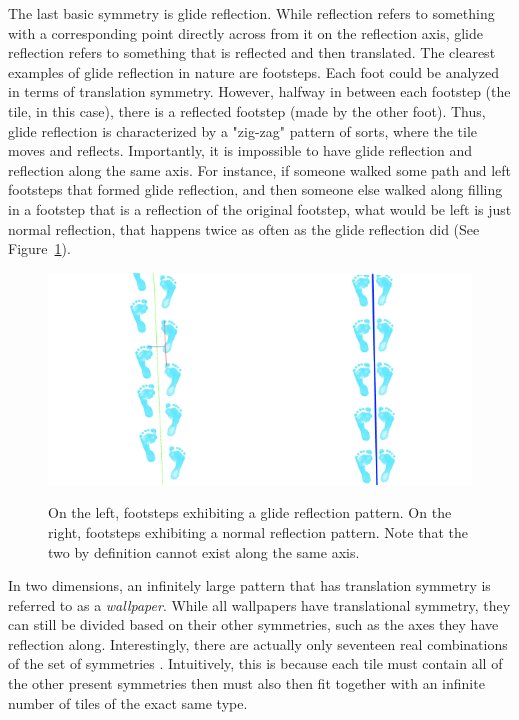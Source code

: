 The last basic symmetry is glide reflection. While reflection refers to something with a corresponding point directly across from it on the reflection axis, glide reflection refers to something that is reflected and then translated. The clearest examples of glide reflection in nature are footsteps. Each foot could be analyzed in terms of translation symmetry. However, halfway in between each footstep (the tile, in this case), there is a reflected footstep (made by the other foot). Thus, glide reflection is characterized by a "zig-zag" pattern of sorts, where the tile moves and reflects. Importantly, it is impossible to have glide reflection and reflection along the same axis. For instance, if someone walked some path and left footsteps that formed glide reflection, and then someone else walked along filling in a footstep that is a reflection of the original footstep, what would be left is just normal reflection, that happens twice as often as the glide reflection did (See Figure~\ref{glide}).

\begin{figure}
\centering
\includegraphics[width=0.9\columnwidth]{glide}
\label{glide}
\caption{On the left, footsteps exhibiting a glide reflection pattern. On the right, footsteps exhibiting a normal reflection pattern. Note that the two by definition cannot exist along the same axis.}
\end{figure}

In two dimensions, an infinitely large pattern that has translation symmetry is referred to as a \textit{wallpaper}. While all wallpapers have translational symmetry, they can still be divided based on their other symmetries, such as the axes they have reflection along. Interestingly, there are actually only seventeen real combinations of the set of symmetries \citep{wallpaper-proof}. Intuitively, this is because each tile must contain all of the other present symmetries then must also then fit together with an infinite number of tiles of the exact same type. 

